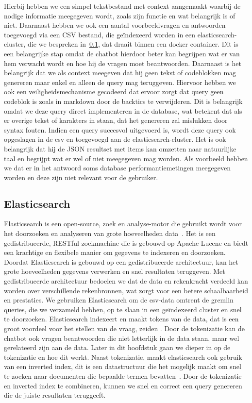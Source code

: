 Hierbij hebben we een simpel tekstbestand met context aangemaakt waarbij de nodige informatie meegegeven wordt, zoals zijn functie en wat belangrijk is of niet.
Daarnaast hebben we ook een aantal voorbeeldvragen en antwoorden toegevoegd via een CSV bestand, die geïndexeerd worden in een elasticsearch-cluster, die we bespreken in~\ref{sec:elasticsearch}, dat draait binnen een docker container.
Dit is een belangrijke stap omdat de chatbot hierdoor beter kan begrijpen wat er van hem verwacht wordt en hoe hij de vragen moet beantwoorden.
Daarnaast is het belangrijk dat we als context meegeven dat hij geen tekst of codeblokken mag genereren maar enkel en alleen de query mag teruggeven.
Hiervoor hebben we ook een veiligheidsmechanisme gecodeerd dat ervoor zorgt dat query geen codeblok is zoals in markdown door de backtics te verwijderen.
Dit is belangrijk omdat we deze query direct implementeren in de database, wat betekent dat als er overige tekst of karakters in staan, dat het genereren zal mislukken door syntax fouten.
Indien een query succesvol uitgevoerd is, wordt deze query ook opgeslagen in de csv en toegevoegd aan de elasticsearch-cluster.
Het is ook belangrijk dat hij de JSON resultset met items kan omzetten naar natuurlijke taal en begrijpt wat er wel of niet meegegeven mag worden.
Als voorbeeld hebben we dat er in het antwoord soms database performantiemetingen meegegeven worden en deze zijn niet relevant voor de gebruiker.

\subsection{Elasticsearch}\label{sec:elasticsearch}
Elasticsearch is een open-source, zoek en analyse-motor die gebruikt wordt voor het doorzoeken en analyseren van grote hoeveelheden data~\autocite{Elastic2025}.
Het is een gedistribueerde, RESTful zoekmachine die is gebouwd op Apache Lucene en biedt een krachtige en flexibele manier om gegevens te indexeren en doorzoeken.
Doordat Elasticsearch is gebouwd op een gedistribueerde architectuur, kan het grote hoeveelheden gegevens verwerken en snel resultaten teruggeven.
Met gedistribueerde architectuur bedoelen we dat de data en rekenkracht verdeeld kan worden over verschillende rekenbronnen, wat zorgt voor een betere schaalbaarheid en prestaties.
We gebruiken Elasticsearch om de csv-data omtrent de gremlin queries, die we verzameld hebben, op te slaan in een geïndexeerd cluster en snel te doorzoeken.
Elasticsearch indexeert en maakt tokens van de data, dat is een groot voordeel voor het stellen van de vraag, zeiden \textcite{Kathare2021}.
Door de tokenizatie kan de chatbot ook vragen beantwoorden die niet letterlijk in de data staan, maar wel gerelateerd zijn aan de data.
Later in dit hoofdstuk gaan we dieper in op de tokenizatie en hoe dit werkt.
Naast tokenizatie, maakt elasticsearch ook gebruik van een inverted index, dit is een datastructuur die het mogelijk maakt om snel te zoeken naar documenten die bepaalde termen bevatten~\autocite{Brimley2023}.
Door de tokenizatie en inverted index te combineren, kunnen we snel en correct een query genereren die de juiste resultaten teruggeeft.

